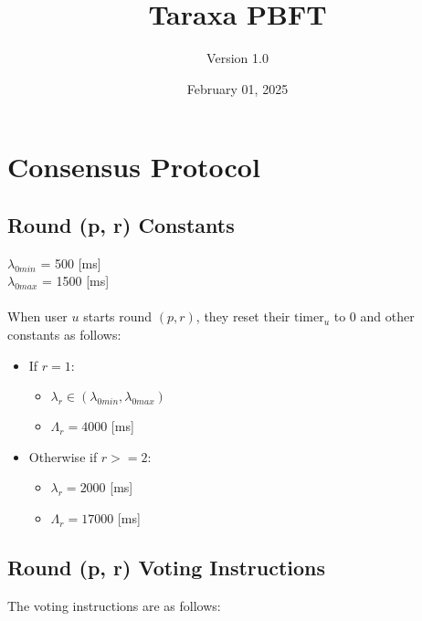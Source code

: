 \documentclass{article}
\title{Taraxa PBFT}
\author{Version 1.0}
\date{February 01, 2025}
\begin{document}
    \maketitle

    \tableofcontents

    \section{Consensus Protocol}
    \subsection{Round (p, r) Constants}

    $\lambda_{0min}$ = 500 [ms]\\
    $\lambda_{0max}$ = 1500 [ms]\\\\
    When user $u$ starts round $(p, r)$, they reset their $\text{timer}_u$ to 0 and other constants as follows:

    \begin{itemize}
        \item If $r = 1$:
        \begin{itemize}
            \item $\lambda_r \in (\lambda_{0min}, \lambda_{0max})$
            \item $\Lambda_r = 4000$ [ms]
        \end{itemize}

        \item Otherwise if $r >= 2$:
        \begin{itemize}
            \item $\lambda_r = 2000$ [ms]
            \item $\Lambda_r = 17000$ [ms]
        \end{itemize}
    \end{itemize}

    \subsection{Round (p, r) Voting Instructions}
    The voting instructions are as follows:
\end{document}

